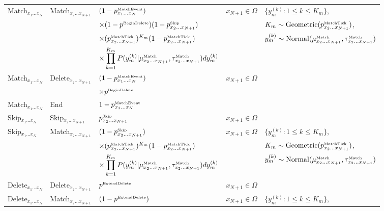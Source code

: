 \documentclass[10pt]{article}
\begin{document}
\begin{tabular}{lllll}
Match${}_{x_1 \ldots x_N}$ & Match${}_{x_2 \ldots x_{N+1}}$ & $(1 - {p^{\mbox{\tiny MatchEvent}}_{x_1\ldots x_N}})$ & $x_{N+1} \in \Omega$ & $\{ y_m^{(k)}: 1 \leq k \leq K_m \}$, \\
& & $\times (1 - p^{\mbox{\tiny BeginDelete}}) (1 - p^{\mbox{\tiny Skip}}_{x_2\ldots x_{N+1}})$ & & $K_m \sim \mbox{Geometric}(p^{\mbox{\tiny MatchTick}}_{x_2\ldots x_{N+1}})$, \\
& & $\times (p^{\mbox{\tiny MatchTick}}_{x_2\ldots x_{N+1}})^{K_m} (1-p^{\mbox{\tiny MatchTick}}_{x_2\ldots x_{N+1}})$ & & $y_m^{(k)} \sim \mbox{Normal}(\mu^{\mbox{\tiny Match}}_{x_2\ldots x_{N+1}},\tau^{\mbox{\tiny Match}}_{x_2\ldots x_{N+1}})$ \\
& & $\times \displaystyle \prod_{k=1}^{K_m} P(y^{(k)}_m|\mu^{\mbox{\tiny Match}}_{x_2\ldots x_{N+1}},\tau^{\mbox{\tiny Match}}_{x_2\ldots x_{N+1}}) dy^{(k)}_m$ \\
Match${}_{x_1 \ldots x_N}$ & Delete${}_{x_2 \ldots x_{N+1}}$ & $(1 - {p^{\mbox{\tiny MatchEvent}}_{x_1\ldots x_N}})$ & $x_{N+1} \in \Omega$ & \\
& & $\times p^{\mbox{\tiny BeginDelete}}$ & & \\
Match${}_{x_1 \ldots x_N}$ & End & $1 - {p^{\mbox{\tiny MatchEvent}}_{x_1\ldots x_N}}$ & & \\
Skip${}_{x_1 \ldots x_N}$ & Skip${}_{x_2 \ldots x_{N+1}}$ & $p^{\mbox{\tiny Skip}}_{x_2\ldots x_{N+1}}$ & $x_{N+1} \in \Omega$ & \\
Skip${}_{x_1 \ldots x_N}$ & Match${}_{x_2 \ldots x_{N+1}}$ & $(1 - p^{\mbox{\tiny Skip}}_{x_2\ldots x_{N+1}})$ & $x_{N+1} \in \Omega$ & $\{ y_m^{(k)}: 1 \leq k \leq K_m \}$, \\
& & $\times (p^{\mbox{\tiny MatchTick}}_{x_2\ldots x_{N+1}})^{K_m} (1-p^{\mbox{\tiny MatchTick}}_{x_2\ldots x_{N+1}})$ & & $K_m \sim \mbox{Geometric}(p^{\mbox{\tiny MatchTick}}_{x_2\ldots x_{N+1}})$, \\
& & $\times \displaystyle \prod_{k=1}^{K_m} P(y^{(k)}_m|\mu^{\mbox{\tiny Match}}_{x_2\ldots x_{N+1}},\tau^{\mbox{\tiny Match}}_{x_2\ldots x_{N+1}}) dy^{(k)}_m$ & & $y_m^{(k)} \sim \mbox{Normal}(\mu^{\mbox{\tiny Match}}_{x_2\ldots x_{N+1}},\tau^{\mbox{\tiny Match}}_{x_2\ldots x_{N+1}})$ \\
Delete${}_{x_1 \ldots x_N}$ & Delete${}_{x_2 \ldots x_{N+1}}$ & $p^{\mbox{\tiny ExtendDelete}}$ & $x_{N+1} \in \Omega$ & \\
Delete${}_{x_1 \ldots x_N}$ & Match${}_{x_2 \ldots x_{N+1}}$ & $(1 - p^{\mbox{\tiny ExtendDelete}})$ & $x_{N+1} \in \Omega$ & $\{ y_m^{(k)}: 1 \leq k \leq K_m \}$, \\

\end{tabular}
\end{document}
